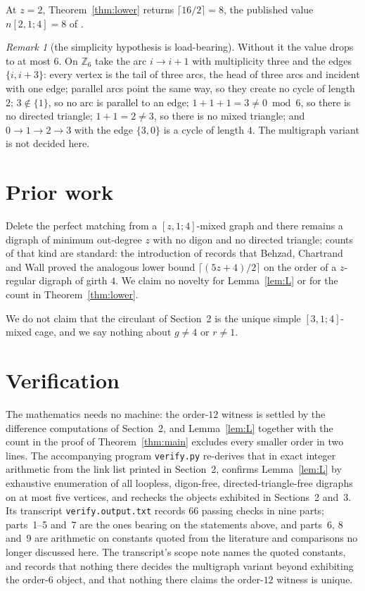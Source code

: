 \documentclass[11pt]{amsart}
\theoremstyle{remark}
\newtheorem*{remark}{Remark}
\newcommand{\mn}[1]{n[#1]}
\begin{document}
At $z=2$, Theorem~\ref{thm:lower} returns $\lceil16/2\rceil=8$, the published
value $\mn{2,1;4}=8$ of \cite{AHM}.

\begin{remark}[the simplicity hypothesis is load-bearing]
Without it the value drops to at most $6$. On $\mathbb Z_6$ take the arc
$i\to i+1$ with multiplicity three and the edges $\{i,i+3\}$: every vertex is the
tail of three arcs, the head of three arcs and incident with one edge; parallel
arcs point the same way, so they create no cycle of length $2$; $3\notin\{1\}$,
so no arc is parallel to an edge; $1+1+1=3\ne0\bmod 6$, so there is no directed
triangle; $1+1=2\ne3$, so there is no mixed triangle; and $0\to1\to2\to3$ with
the edge $\{3,0\}$ is a cycle of length $4$. The multigraph variant is not
decided here.
\end{remark}

\section{Prior work}

Delete the perfect matching from a $[z,1;4]$-mixed graph and there remains a
digraph of minimum out-degree $z$ with no digon and no directed triangle; counts
of that kind are standard: the introduction of \cite{AHM} records that Behzad,
Chartrand and Wall \cite{BCW} proved the analogous lower bound
$\lceil(5z+4)/2\rceil$ on the order of a $z$-regular digraph of girth $4$. We
claim no novelty for Lemma~\ref{lem:L} or for the count in
Theorem~\ref{thm:lower}.

We do not claim that the circulant of Section~2 is the unique simple
$[3,1;4]$-mixed cage, and we say nothing about $g\ne4$ or $r\ne1$.

\section{Verification}

The mathematics needs no machine: the order-$12$ witness is settled by the
difference computations of Section~2, and Lemma~\ref{lem:L} together with the
count in the proof of Theorem~\ref{thm:main} excludes every smaller order in two
lines. The accompanying program \texttt{verify.py} re-derives that in exact
integer arithmetic from the link list printed in Section~2, confirms
Lemma~\ref{lem:L} by exhaustive enumeration of all loopless, digon-free,
directed-triangle-free digraphs on at most five vertices, and rechecks the objects
exhibited in Sections~2 and~3.
Its transcript \texttt{verify.output.txt} records $66$ passing checks in nine
parts; parts~1--5 and~7 are the ones bearing on the statements above, and
parts~6, 8 and~9 are arithmetic on constants quoted from the literature and
comparisons no longer discussed here. The transcript's scope note names the
quoted constants, and records that nothing there decides the multigraph variant
beyond exhibiting the order-$6$ object, and that nothing there claims the
order-$12$ witness is unique.
\end{document}
